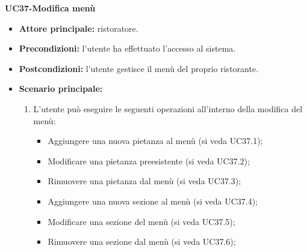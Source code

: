\iffalse %
    \textbf{UC36.4-Visualizzazione lista Clienti}  %
\begin{itemize}
    \item \textbf{Attore principale:} ristoratore.
    \item \textbf{Precondizioni:} 
    \item \textbf{Postcondizioni:} l'utente visualizza la lista dei clienti collegati alla singola prenotazione.
    \item \textbf{Scenario principale:}
\end{itemize}

Non sono sicuro di questa perché a mio parere c'è molta somiglianza tra uc36.4 e uc40
\fi %


\textbf{UC37-Modifica menù}  
\begin{itemize}
    \item \textbf{Attore principale:} ristoratore.
    \item \textbf{Precondizioni:} l'utente ha effettuato l'accesso al sistema.
    \item \textbf{Postcondizioni:} l'utente gestisce il menù del proprio ristorante.
    \item \textbf{Scenario principale:}
    \begin{enumerate}
        \item L'utente può eseguire le seguenti operazioni all'interno della modifica del menù:
        \begin{itemize}
           \item Aggiungere una nuova pietanza al menù (si veda UC37.1);
           \item Modificare una pietanza preesistente (si veda UC37.2);
           \item Rimuovere una pietanza dal menù (si veda UC37.3);
           \item Aggiungere una nuova sezione al menù (si veda UC37.4);
           \item Modificare una sezione del menù (si veda UC37.5);
           \item Rimuovere una sezione dal menù (si veda UC37.6);
        \end{itemize}
    \end{enumerate}
\end{itemize}

